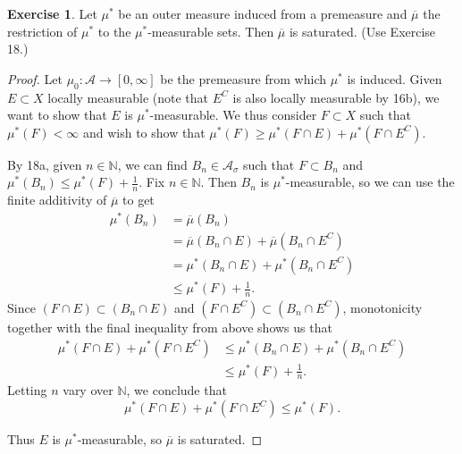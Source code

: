 \documentclass{article}
\theoremstyle{definition}
\newtheorem{ex}{Exercise}
\begin{document}
\begin{ex}
	Let $\mu^*$ be an outer measure induced from a premeasure and $\overline{\mu}$ the restriction of $\mu^*$ to the $\mu^*$-measurable sets.
	Then $\overline{\mu}$ is saturated.
	(Use Exercise 18.)
\end{ex}
\begin{proof}
	Let $\mu_0: \mathscr{A} \to [0, \infty]$ be the premeasure from which $\mu^*$ is induced.
	Given $E \subset X$ locally measurable (note that $E^C$ is also locally measurable by 16b), we want to show that $E$ is $\mu^*$-measurable.
	We thus consider $F \subset X$ such that $\mu^*(F) < \infty$ and wish to show that $\mu^*(F) \geq \mu^*(F \cap E) + \mu^*(F \cap E^C)$.

	By 18a, given $n \in \mathbb{N}$, we can find $B_n \in \mathscr{A}_\sigma$ such that $F \subset B_n$ and $\mu^*(B_n) \leq \mu^*(F) + \frac{1}{n}$.
	Fix $n \in \mathbb{N}$.
	Then $B_n$ is $\mu^*$-measurable, so we can use the finite additivity of $\overline{\mu}$ to get \begin{align*}
		\mu^*(B_n) & = \overline{\mu}(B_n)                                       \\
		           & = \overline{\mu}(B_n \cap E) + \overline{\mu}(B_n \cap E^C) \\
		           & = \mu^*(B_n \cap E) + \mu^*(B_n \cap E^C)                   \\
		           & \leq \mu^*(F) + \frac{1}{n}.
	\end{align*}
	Since $(F \cap E) \subset (B_n \cap E)$ and $(F \cap E^C) \subset (B_n \cap E^C)$, monotonicity together with the final inequality from above shows us that \begin{align*}
		\mu^*(F \cap E) + \mu^*(F \cap E^C) & \leq \mu^*(B_n \cap E) + \mu^*(B_n \cap E^C) \\
		                                    & \leq \mu^*(F) + \frac{1}{n}.
	\end{align*}
	Letting $n$ vary over $\mathbb{N}$, we conclude that \begin{equation*}
		\mu^*(F \cap E) + \mu^*(F \cap E^C) \leq \mu^*(F).
	\end{equation*}

	Thus $E$ is $\mu^*$-measurable, so $\overline{\mu}$ is saturated.
\end{proof}
\end{document}
